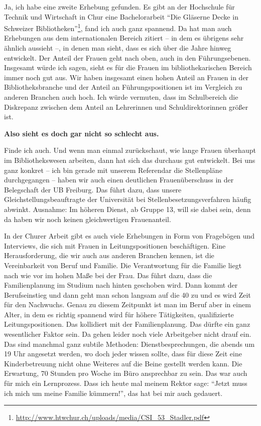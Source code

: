 \documentclass[a4paper,
fontsize=11pt,
oneside,
numbers=noperiodatend,
parskip=half-,
bibliography=totoc,
final
]{scrartcl}
\begin{document}
Ja, ich habe eine zweite Erhebung gefunden. Es gibt an der Hochschule
für Technik und Wirtschaft in Chur eine Bachelorarbeit \enquote{Die
Gläserne Decke in Schweizer Bibliotheken}\footnote{\url{http://www.htwchur.ch/uploads/media/CSI_53_Stadler.pdf}},
fand ich auch ganz spannend. Da hat man auch Erhebungen aus dem
internationalen Bereich zitiert -- in dem es übrigens sehr ähnlich
aussieht --, in denen man sieht, dass es sich über die Jahre hinweg
entwickelt. Der Anteil der Frauen geht nach oben, auch in den
Führungsebenen. Insgesamt würde ich sagen, sieht es für die Frauen im
bibliothekarischen Bereich immer noch gut aus. Wir haben insgesamt einen
hohen Anteil an Frauen in der Bibliotheksbranche und der Anteil an
Füh\-rungs\-po\-si\-tionen ist im Vergleich zu anderen Branchen auch hoch. Ich
würde vermuten, dass im Schulbereich die Diskrepanz zwischen dem Anteil
an Lehrerinnen und Schuldirektorinnen größer ist.

\textbf{Also sieht es doch gar nicht so schlecht aus.}

Finde ich auch. Und wenn man einmal zurückschaut, wie lange Frauen
überhaupt im Bibliothekswesen arbeiten, dann hat sich das durchaus gut
entwickelt. Bei uns ganz konkret -- ich bin gerade mit unserem
Referendar die Stellenpläne durchgegangen -- haben wir auch einen
deutlichen Frauenüberschuss in der Belegschaft der UB Freiburg. Das
führt dazu, dass unsere Gleichstellungsbeauftragte der Universität bei
Stellenbesetzungsverfahren häufig abwinkt. Ausnahme: Im höheren Dienst,
ab Gruppe 13, will sie dabei sein, denn da haben wir noch keinen
gleichwertigen Frauenanteil.

In der Churer Arbeit gibt es auch viele Erhebungen in Form von
Fragebögen und Interviews, die sich mit Frauen in Leitungspositionen
beschäftigen. Eine Herausforderung, die wir auch aus anderen Branchen
kennen, ist die Vereinbarkeit von Beruf und Familie. Die Verantwortung
für die Familie liegt nach wie vor im hohen Maße bei der Frau. Das führt
dazu, dass die Familienplanung im Studium nach hinten geschoben wird.
Dann kommt der Berufseinstieg und dann geht man schon langsam auf die 40
zu und es wird Zeit für den Nachwuchs. Genau zu diesem Zeitpunkt ist man
im Beruf aber in einem Alter, in dem es richtig spannend wird für höhere
Tätigkeiten, qualifizierte Leitungspositionen. Das kollidiert mit der
Familienplanung. Das dürfte ein ganz wesentlicher Faktor sein. Da gehen
leider noch viele Arbeitgeber nicht drauf ein. Das sind manchmal ganz
subtile Methoden: Dienstbesprechungen, die abends um 19 Uhr angesetzt
werden, wo doch jeder wissen sollte, dass für diese Zeit eine
Kinderbetreuung nicht ohne Weiteres auf die Beine gestellt werden kann.
Die Erwartung, 70 Stunden pro Woche im Büro ansprechbar zu sein. Das war
auch für mich ein Lernprozess. Dass ich heute mal meinem Rektor sage:
\enquote{Jetzt muss ich mich um meine Familie kümmern!}, das hat bei mir
auch gedauert.
\end{document}
